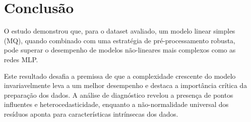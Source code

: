 \section{Conclusão}
\label{chap:conclusao}
O estudo demonstrou que, para o dataset avaliado, um modelo linear simples (MQ), quando combinado com uma estratégia de pré-processamento robusta, pode superar o desempenho de modelos não-lineares mais complexos como as redes MLP. 

Este resultado desafia a premissa de que a complexidade crescente do modelo invariavelmente leva a um melhor desempenho e destaca a importância crítica da preparação dos dados. A análise de diagnóstico revelou a presença de pontos influentes e heterocedasticidade, enquanto a não-normalidade universal dos resíduos aponta para características intrínsecas dos dados. 